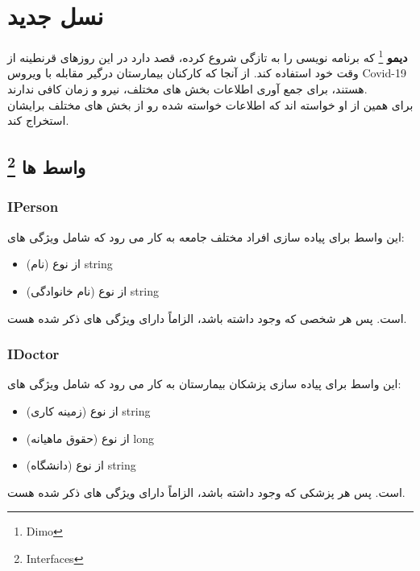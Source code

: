 
    \section{
    نسل جدید
    \grayBox{\textcolor{purple}{C\#}}
    }
    \textbf{دیمو}
    \footnote{Dimo}
    که برنامه نویسی را به تازگی شروع کرده، قصد دارد در این روزهای قرنطینه از وقت خود استفاده کند.
    از آنجا که کارکنان بیمارستان درگیر مقابله با ویروس Covid-19
    هستند، برای جمع آوری اطلاعات بخش های مختلف، نیرو و زمان کافی ندارند.
    \\ 
    برای همین از او خواسته اند که اطلاعات خواسته شده رو از بخش های مختلف برایشان استخراج کند.
    \subsection{
    واسط ها
    \footnote{Interfaces}
    }
        \subsubsection{IPerson}
        این واسط برای پیاده سازی افراد مختلف جامعه به کار می رود که شامل ویژگی های:
        \begin{itemize}
        \item 
            (نام)
             از نوع 
            string 
        \item
            (نام خانوادگی)
            از نوع
            string
        \end{itemize}
        است.
        پس هر شخصی که وجود داشته باشد، الزاماً دارای ویژگی های ذکر شده هست.
        
        \subsubsection{IDoctor}
        این واسط برای پیاده سازی پزشکان بیمارستان به کار می رود که شامل ویژگی های:
        \begin{itemize}
        \item 
            (زمینه کاری)
             از نوع 
            string 
        \item
            (حقوق ماهیانه)
            از نوع
            long
        \item
            (دانشگاه)
            از نوع
            string
        \end{itemize}
        است.
        پس هر پزشکی که وجود داشته باشد، الزاماً دارای ویژگی های ذکر شده هست.
